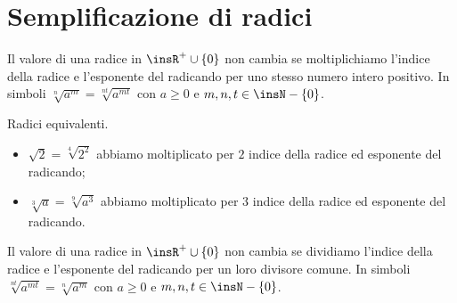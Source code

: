 
\section{Semplificazione di radici}
\label{sec:radici_semplificazione}

\begin{proposizione}
Il valore di una radice in \(\insR^+\cup \{0\}\) non cambia se moltiplichiamo 
l'indice della radice e l'esponente del radicando per uno stesso numero intero 
positivo. In simboli \(\sqrt[n]{a^m}=\sqrt[\mathit{nt}]{a^{\mathit{mt}}}\) 
con \(a\ge 0\) e \(m,n,t\in \insN-\{0\}\).
\end{proposizione}
\begin{exrig}
 \begin{esempio}
 Radici equivalenti.
 \begin{itemize}
 \item \(\sqrt 2=\sqrt[4]{2^2}\) abbiamo moltiplicato per \(2\) indice della 
  radice ed esponente del radicando;
 \item \(\sqrt[3]a=\sqrt[9]{a^3}\) abbiamo moltiplicato per \(3\) indice della 
  radice ed esponente del radicando.
\end{itemize}
 \end{esempio}
\end{exrig}

\begin{proposizione}
Il valore di una radice in \(\insR^+\cup \{0\}\) non cambia se dividiamo 
l'indice della radice e l'esponente del radicando per un loro divisore comune. 
In simboli \(\sqrt[nt]{a^{mt}}=\sqrt[n]{a^m}\) con \(a\ge 0\) e 
\(m,n,t\in \insN-\{0\}\).
\end{proposizione}

